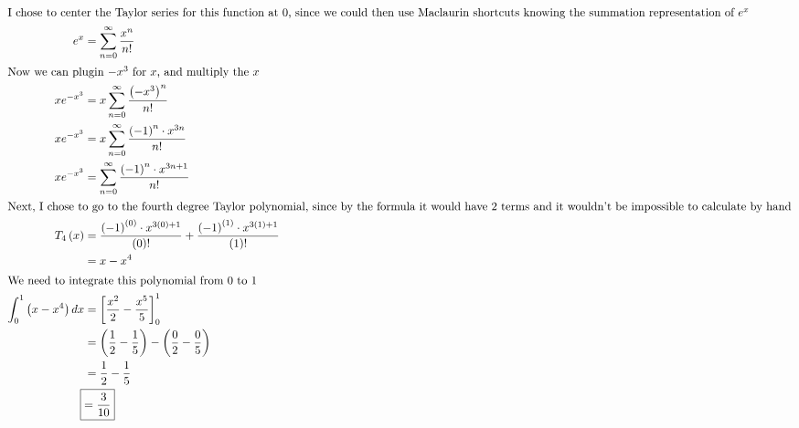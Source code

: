 \documentclass[12pt]{article}
\begin{document}
\begin{align}
  \intertext{I chose to center the Taylor series for this function at $0$, since we could then use Maclaurin shortcuts knowing the summation representation of $e^x$}
  e^{x}                              & =\sum_{n=0}^{\infty}\frac{x^{n}}{n!}                                                                                                                                     \\
  \intertext{Now we can plugin $-x^3$ for $x$, and multiply the $x$}
  xe^{-x^{3}}                        & =x\sum_{n=0}^{\infty}\frac{\left(-x^{3}\right)^{n}}{n!}                                                                                                                  \\
  xe^{-x^{3}}                        & =x\sum_{n=0}^{\infty}\frac{\left(-1\right)^{n}\cdot x^{3n}}{n!}                                                                                                       \\
  xe^{-x^{3}}                        & =\sum_{n=0}^{\infty}\frac{\left(-1\right)^{n}\cdot x^{3n+1}}{n!}                                                                                                         \\
  \intertext{Next, I chose to go to the fourth degree Taylor polynomial, since by the formula it would have $2$ terms and it wouldn't be impossible to calculate by hand}
  T_{4}\left(x\right)                & =\frac{\left(-1\right)^{\left(0\right)}\cdot x^{3\left(0\right)+1}}{\left(0\right)!}+\frac{\left(-1\right)^{\left(1\right)}\cdot x^{3\left(1\right)+1}}{\left(1\right)!} \\
                                     & =x-x^{4}                                                                                                                                                                 \\
  \intertext{We need to integrate this polynomial from $0$ to $1$}
  \int_{0}^{1}\left(x-x^{4}\right)dx & =\left[\frac{x^{2}}{2}-\frac{x^{5}}{5}\right]_{0}^{1}                                                                                                                    \\
                                     & =\left(\frac{1}{2}-\frac{1}{5}\right)-\left(\frac{0}{2}-\frac{0}{5}\right)                                                                                               \\
                                     & =\frac{1}{2}-\frac{1}{5}                                                                                                                                                 \\
                                     \Aboxed{& =\frac{3}{10}}                                                                                                                                                            
\end{align}
\end{document}
